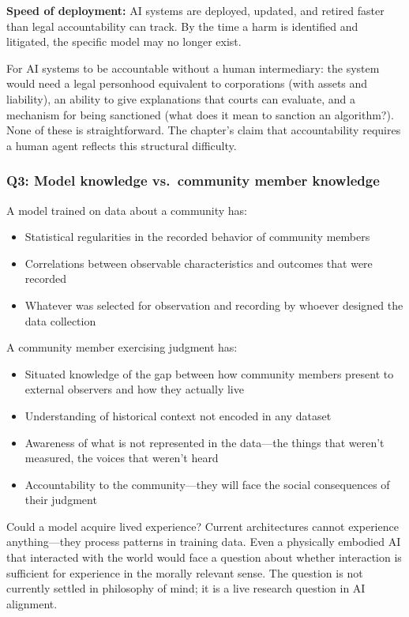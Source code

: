 \textbf{Speed of deployment:} AI systems are deployed, updated, and retired faster than legal accountability can track. By the time a harm is identified and litigated, the specific model may no longer exist.

For AI systems to be accountable without a human intermediary: the system would need a legal personhood equivalent to corporations (with assets and liability), an ability to give explanations that courts can evaluate, and a mechanism for being sanctioned (what does it mean to sanction an algorithm?). None of these is straightforward. The chapter's claim that accountability requires a human agent reflects this structural difficulty.

\subsubsection*{Q3: Model knowledge vs.\ community member knowledge}

A model trained on data about a community has:
\begin{itemize}
    \item Statistical regularities in the recorded behavior of community members
    \item Correlations between observable characteristics and outcomes that were recorded
    \item Whatever was selected for observation and recording by whoever designed the data collection
\end{itemize}

A community member exercising judgment has:
\begin{itemize}
    \item Situated knowledge of the gap between how community members present to external observers and how they actually live
    \item Understanding of historical context not encoded in any dataset
    \item Awareness of what is not represented in the data---the things that weren't measured, the voices that weren't heard
    \item Accountability to the community---they will face the social consequences of their judgment
\end{itemize}

Could a model acquire lived experience? Current architectures cannot experience anything---they process patterns in training data. Even a physically embodied AI that interacted with the world would face a question about whether interaction is sufficient for experience in the morally relevant sense. The question is not currently settled in philosophy of mind; it is a live research question in AI alignment.

